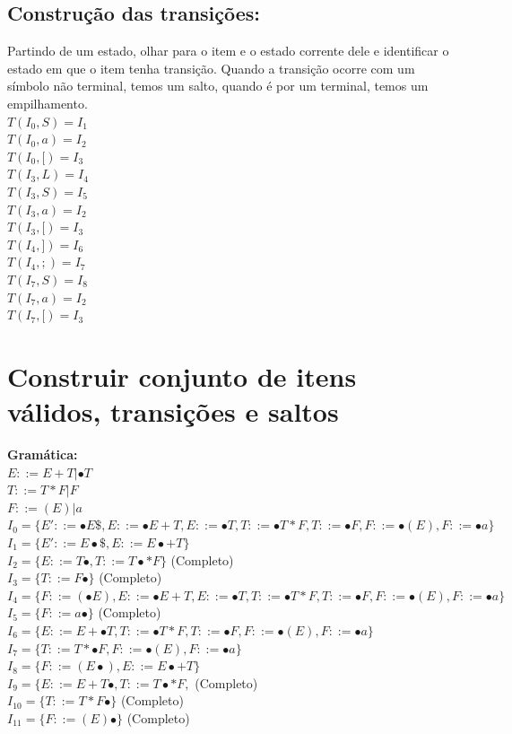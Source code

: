 \documentclass[ 12pt, a4paper]{article}
\begin{document}
	\subsection{Construção das transições:}
		Partindo de um estado, olhar para o item e o estado corrente dele e identificar o estado em que o item tenha transição. Quando a transição ocorre com um símbolo não terminal, temos um salto, quando é por um terminal, temos um empilhamento.\\
		$T(I_0,S)=I_1$\\
		$T(I_0,a)=I_2$\\
		$T(I_0,[)=I_3$\\
		$T(I_3,L)=I_4$\\
		$T(I_3,S)=I_5$\\
		$T(I_3,a)=I_2$\\
		$T(I_3,[)=I_3$\\
		$T(I_4,])=I_6$\\
		$T(I_4,;)=I_7$\\
		$T(I_7,S)=I_8$\\
		$T(I_7,a)=I_2$\\
		$T(I_7,[)=I_3$\\
\newpage
\section{Construir conjunto de itens válidos, transições e saltos}
	\textbf{Gramática:}\\
	$E::=E+T| \bullet T$\\
	$T::=T*F|F$\\
	$F::= (E) | a $\\
	$I_0 = \{ E' ::= \bullet E \$ , E::= \bullet E+T, E::= \bullet T, T::= \bullet T*F, T::= \bullet F, F::= \bullet (E), F::= \bullet a \}$\\
	$I_1 = \{E' ::= E \bullet \$, E::= E\bullet +T \}  $ \\
	$I_2 = \{E::= T\bullet, T::= T\bullet *F\}  $ (Completo) \\
	$I_3 = \{T::= F \bullet \}  $ (Completo) \\
	$I_4 = \{F::= (\bullet E), E::= \bullet E+T, E::= \bullet T, T::= \bullet T * F, T::= \bullet F, F::= \bullet (E), F::= \bullet a\}  $ \\
	$I_5 = \{F::= a\bullet\}  $ (Completo) \\
	$I_6 = \{E::= E+\bullet T, T::= \bullet T*F, T::= \bullet F, F::= \bullet(E), F::= \bullet a\}  $ \\
	$I_7 = \{T::= T*\bullet F,F::= \bullet(E), F::= \bullet a\}$ \\
	$I_8 = \{F::= (E\bullet), E::= E \bullet + T\}  $ \\
	$I_9 = \{E::= E+T \bullet, T::= T\bullet * F,   $ (Completo) \\
	$I_{10} = \{T::= T*F \bullet\}  $ (Completo) \\
	$I_{11} = \{F::= (E)\bullet\}  $ (Completo)\\
\end{document}
